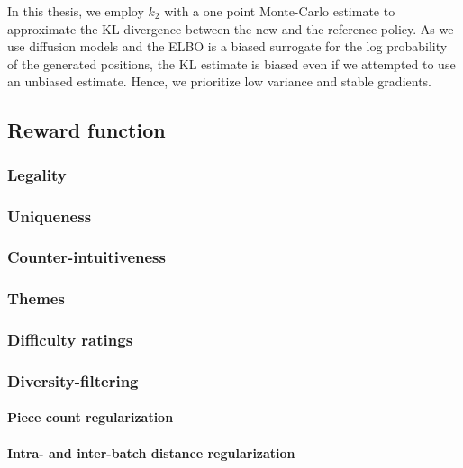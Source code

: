 In this thesis, we employ $k_2$ with a one point Monte-Carlo estimate to approximate the KL divergence between the new and the reference policy. As we use diffusion models and the ELBO is a biased surrogate for the log probability of the generated positions, the KL estimate is biased even if we attempted to use an unbiased estimate. Hence, we prioritize low variance and stable gradients.




\subsection{Reward function}
\label{sec:reward function}

\subsubsection{Legality}

\subsubsection{Uniqueness}

\subsubsection{Counter-intuitiveness}

\subsubsection{Themes}

\subsubsection{Difficulty ratings}

\subsubsection{Diversity-filtering}

\paragraph{Piece count regularization}

\paragraph{Intra- and inter-batch distance regularization}

